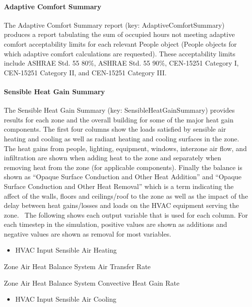 \paragraph{Adaptive Comfort Summary}\label{adaptive-comfort-summary}

The Adaptive Comfort Summary report (key: AdaptiveComfortSummary) produces a report tabulating the sum of occupied hours not meeting adaptive comfort acceptability limits for each relevant People object (People objects for which adaptive comfort calculations are requested). These acceptability limits include ASHRAE Std. 55 80\%, ASHRAE Std. 55 90\%, CEN-15251 Category I, CEN-15251 Category II, and CEN-15251 Category III.

\paragraph{Sensible Heat Gain Summary}\label{sensible-heat-gain-summary}

The Sensible Heat Gain Summary (key: SensibleHeatGainSummary) provides results for each zone and the overall building for some of the major heat gain components. The first four columns show the loads satisfied by sensible air heating and cooling as well as radiant heating and cooling surfaces in the zone. The heat gains from people, lighting, equipment, windows, interzone air flow, and infiltration are shown when adding heat to the zone and separately when removing heat from the zone (for applicable components). Finally the balance is shown as ``Opaque Surface Conduction and Other Heat Addition'' and ``Opaque Surface Conduction and Other Heat Removal'' which is a term indicating the affect of the walls, floors and ceilings/roof to the zone as well as the impact of the delay between heat gains/losses and loads on the HVAC equipment serving the zone.~ The following shows each output variable that is used for each column. For each timestep in the simulation, positive values are shown as additions and negative values are shown as removal for most variables.

\begin{itemize}
\tightlist
\item
  HVAC Input Sensible Air Heating
\end{itemize}

Zone Air Heat Balance System Air Transfer Rate

Zone Air Heat Balance System Convective Heat Gain Rate

\begin{itemize}
\tightlist
\item
  HVAC Input Sensible Air Cooling
\end{itemize}


